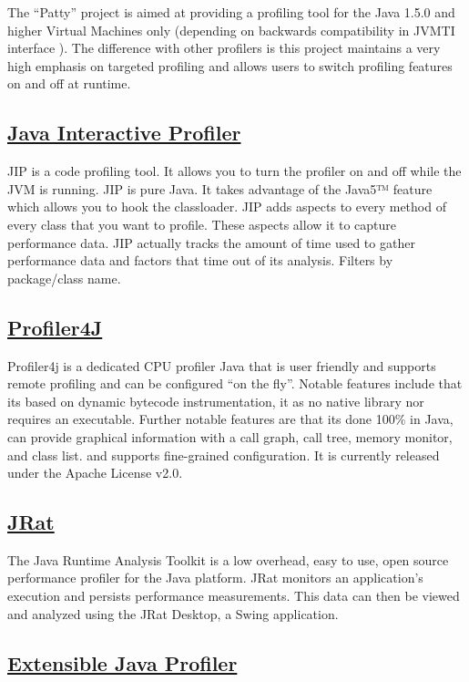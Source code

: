 The ``Patty'' project is aimed at providing a profiling tool for the Java 1.5.0 and higher Virtual Machines only (depending on backwards compatibility in JVMTI interface ). The difference with other profilers is this project maintains a very high emphasis on targeted profiling and allows users to switch profiling features on and off at runtime.


\subsection{\href{http://jiprof.sourceforge.net/}{Java Interactive Profiler}}

JIP is a code profiling tool. It allows you to turn the profiler on and off while the JVM is running. JIP is pure Java. It takes advantage of the Java5™ feature which allows you to hook the classloader. JIP adds aspects to every method of every class that you want to profile. These aspects allow it to capture performance data. JIP actually tracks the amount of time used to gather performance data and factors that time out of its analysis. Filters by package/class name.


\subsection{\href{http://profiler4j.sourceforge.net/}{Profiler4J}}

Profiler4j is a dedicated CPU profiler Java that is user friendly and supports remote profiling and can be configured “on the fly”. Notable features include that its based on dynamic bytecode instrumentation, it as no native library nor requires an executable. Further notable features are that its done 100\% in Java, can provide graphical information with a call graph, call tree, memory monitor, and class list. and supports fine-grained configuration. It is currently released under the Apache License v2.0.


\subsection{\href{http://jrat.sourceforge.net/}{JRat}}

The Java Runtime Analysis Toolkit is a low overhead, easy to use, open source performance profiler for the Java platform. JRat monitors an application's execution and persists performance measurements. This data can then be viewed and analyzed using the JRat Desktop, a Swing application.


\subsection{\href{http://ejp.sourceforge.net/}{Extensible Java Profiler}}

